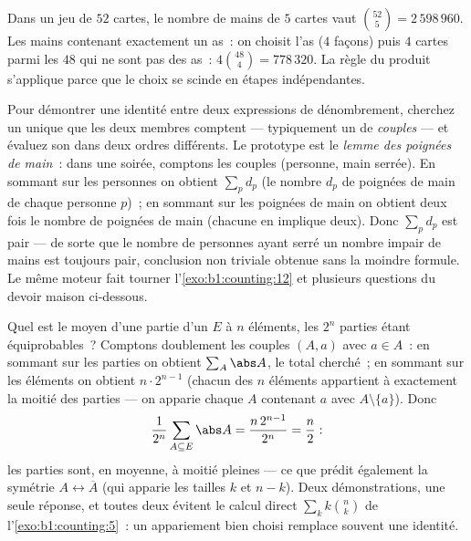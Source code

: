 \begin{example}\label{ex:b1:counting:poker}
Dans un jeu de $52$ cartes, le nombre de mains de $5$ cartes vaut
$\binom{52}{5} = 2\,598\,960$. Les mains contenant exactement un as~:
on choisit l'as ($4$ façons) puis $4$ cartes parmi les $48$ qui ne sont
pas des as~: $4 \binom{48}{4} = 778\,320$. La règle du produit
s'applique parce que le choix se scinde en étapes indépendantes.
\end{example}

\begin{method}\label{met:b1:counting:doublecount}
Pour démontrer une identité entre deux expressions de dénombrement,
cherchez un unique  que les deux membres comptent ---
typiquement un  de \emph{couples} --- et évaluez son 
dans deux ordres différents. Le prototype est le \emph{lemme des
poignées de main}~: dans une soirée, comptons les couples (personne,
main serrée). En sommant sur les personnes on obtient $\sum_p d_p$ (le
nombre $d_p$ de poignées de main de chaque personne $p$)~; en sommant
sur les poignées de main on obtient deux fois le nombre de poignées de
main (chacune en implique deux). Donc $\sum_p d_p$ est pair --- de sorte
que le nombre de personnes ayant serré un nombre impair de mains est
toujours pair, conclusion non triviale obtenue sans la moindre formule.
Le même moteur fait tourner l'\cref{exo:b1:counting:12} et plusieurs
questions du devoir maison ci-dessous.
\end{method}

\begin{example}\label{ex:b1:counting:averagesubset}
Quel est le  moyen d'une partie d'un  $E$ à $n$
éléments, les $2^n$ parties étant équiprobables~? Comptons doublement
les couples $(A, a)$ avec $a \in A$~: en sommant sur les parties on
obtient $\sum_A \abs A$, le total cherché~; en sommant sur les éléments
on obtient $n \cdot 2^{n-1}$ (chacun des $n$ éléments appartient à
exactement la moitié des parties --- on apparie chaque $A$ contenant $a$
avec $A \setminus \{a\}$). Donc
\[
\frac{1}{2^n}\sum_{A \subseteq E} \abs A
= \frac{n\,2^{n-1}}{2^n} = \frac n2 :
\]
les parties sont, en moyenne, à moitié pleines --- ce que prédit
également la symétrie $A \leftrightarrow \overline A$ (qui apparie les
tailles $k$ et $n - k$). Deux démonstrations, une seule réponse, et
toutes deux évitent le calcul direct $\sum_k k\binom nk$ de
l'\cref{exo:b1:counting:5}~: un appariement bien choisi remplace souvent
une identité.
\end{example}

